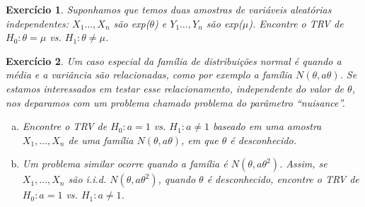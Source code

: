 \documentclass[letter,11pt]{article}
\newtheorem{exer}{Exercício}
\begin{document}
\begin{exer} \rm  %
Suponhamos que temos duas amostras de variáveis aleatórias independentes: $X_1\ldots,X_n$ são exp($\theta$) e $Y_1\ldots,Y_n$ são exp($\mu$). Encontre o TRV de $H_0:\theta=\mu$ vs. $H_1:\theta\neq \mu$.

%
\end{exer}


\begin{exer} \rm  %
Um caso especial da família de distribuições \emph{normal} é quando a média e a variância são relacionadas, como por exemplo a família $N(\theta,a\theta)$. Se estamos interessados em testar esse relacionamento, independente do valor de $\theta$, nos deparamos com um problema chamado problema do parâmetro ``nuisance''.

\begin{enumerate}[a)]
\item Encontre o TRV de $H_0:a=1$ vs. $H_1:a\neq 1$ baseado em uma amostra $X_1,\ldots,X_n$ de uma família $N(\theta,a\theta)$, em que $\theta$ é desconhecido.

\item  Um problema similar ocorre quando a família é $N(\theta,a\theta^2)$. Assim, se  $X_1,\ldots,X_n$ são i.i.d. $N(\theta,a\theta^2)$, quando $\theta$ é desconhecido, encontre o TRV de $H_0:a=1$ vs. $H_1:a\neq 1$.
\end{enumerate}
\end{exer}
\end{document}
